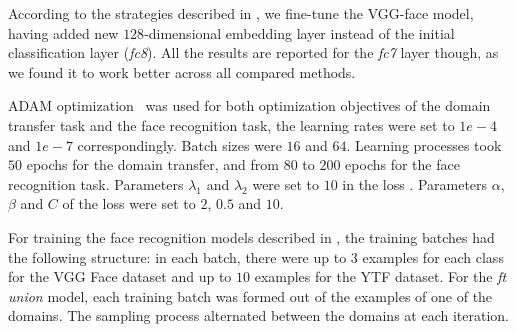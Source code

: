 

According to the strategies described in , we fine-tune the VGG-face model, having added new $128$-dimensional embedding layer instead of the initial classification layer (\textit{fc8}). All the results are reported for the \textit{fc7} layer though, as we found it to work better across all compared methods.

ADAM optimization~\citep{Kingma14} was used for both optimization objectives of the domain transfer task and the face recognition task, the learning rates were set to $1e-4$ and $1e-7$ correspondingly. Batch sizes were $16$ and $64$. Learning processes took $50$ epochs for the domain transfer,  and from $80$ to $200$ epochs for the face recognition task. Parameters $\lambda_1$ and $\lambda_2$ were set to $10$ in the loss . Parameters $\alpha$, $\beta$ and $C$ of the loss  were set to $2$, $0.5$ and $10$.

For training the face recognition models described in , the training batches had the following structure: in each batch, there were up to $3$ examples for each class for the VGG Face dataset and up to $10$ examples for the YTF dataset. For the \textit{ft union} model, each training batch was formed out of the examples of one of the domains. The sampling process alternated between the domains at each iteration.


